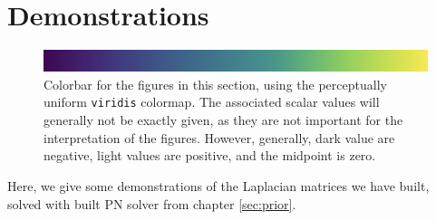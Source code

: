 \ifdefined\COMPILINGFROMMAIN
\else
    
    
\fi
\section{Demonstrations}
\begin{figure}[t]
    \includegraphics[width=1.0\textwidth]{../images/colorbar.png}
    \caption{Colorbar for the figures in this section, using the perceptually uniform \texttt{viridis} \cite{viridis} colormap. The associated scalar values will generally not be exactly given, as they are not important for the interpretation of the figures. However, generally, dark value are negative, light values are positive, and the midpoint is zero.}
\end{figure}
\noindent
Here, we give some demonstrations of the Laplacian matrices we have built, solved with built PN solver from chapter \ref{sec:prior}.

